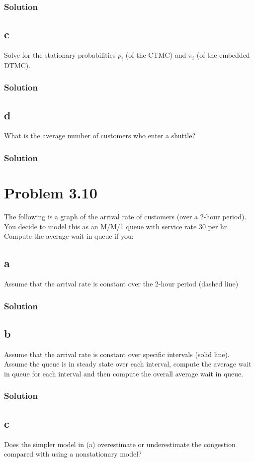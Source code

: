 \documentclass{amsart}
\begin{document}
\subsubsection*{Solution}
\subsection*{c}
Solve for the stationary probabilities $p_i$ (of the CTMC) and $\pi_i$ (of the
embedded DTMC).
\subsubsection*{Solution}
\subsection*{d}
What is the average number of customers who enter a shuttle?
\subsubsection*{Solution}

\section{Problem 3.10} %
The following is a graph of the arrival rate of customers (over a 2-hour
period). You decide to model this as an M/M/1 queue with service rate 30
per hr. Compute the average wait in queue if you:
\subsection*{a}
Assume that the arrival rate is constant over the 2-hour period (dashed
line)
\subsubsection*{Solution}
\subsection*{b}
Assume that the arrival rate is constant over specific intervals (solid
line). Assume the queue is in steady state over each interval, compute
the average wait in queue for each interval and then compute the overall
average wait in queue.
\subsubsection*{Solution}
\subsection*{c}
Does the simpler model in (a) overestimate or underestimate the congestion compared with using a nonstationary model?
\end{document}
